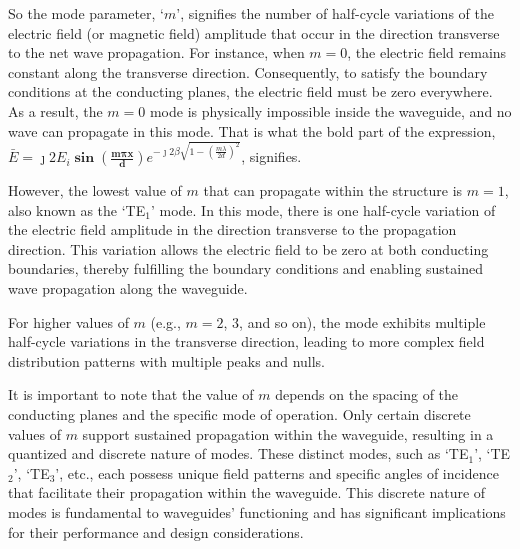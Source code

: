 So the mode parameter, `$m$', signifies the number of half-cycle variations of the electric field (or magnetic field) amplitude that occur in the direction transverse to the net wave propagation. For instance, when $m=0$, the electric field remains constant along the transverse direction. Consequently, to satisfy the boundary conditions at the conducting planes, the electric field must be zero everywhere. As a result, the $m=0$ mode is physically impossible inside the waveguide, and no wave can propagate in this mode. That is what the bold part of the expression, $\bar{E} = \jmath 2E_i\boldsymbol{\sin(\frac{m\pi x}{d})}e^{-\jmath 2\beta\sqrt{1 - \left(\frac{m\lambda}{2d}\right)^2}}$, signifies.

However, the lowest value of $m$ that can propagate within the structure is $m=1$, also known as the `TE$_1$' mode. In this mode, there is one half-cycle variation of the electric field amplitude in the direction transverse to the propagation direction. This variation allows the electric field to be zero at both conducting boundaries, thereby fulfilling the boundary conditions and enabling sustained wave propagation along the waveguide.

For higher values of $m$ (e.g., $m=2$, $3$, and so on), the mode exhibits multiple half-cycle variations in the transverse direction, leading to more complex field distribution patterns with multiple peaks and nulls.

It is important to note that the value of $m$ depends on the spacing of the conducting planes and the specific mode of operation. Only certain discrete values of $m$ support sustained propagation within the waveguide, resulting in a quantized and discrete nature of modes. These distinct modes, such as `TE$_1$', `TE$_2$', `TE$_3$', etc., each possess unique field patterns and specific angles of incidence that facilitate their propagation within the waveguide. This discrete nature of modes is fundamental to waveguides' functioning and has significant implications for their performance and design considerations.

